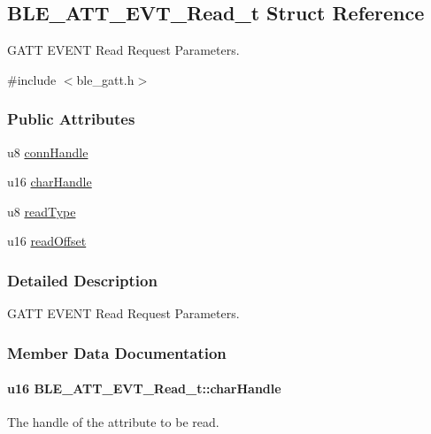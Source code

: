 \hypertarget{struct_b_l_e___a_t_t___e_v_t___read__t}{}\subsection{B\+L\+E\+\_\+\+A\+T\+T\+\_\+\+E\+V\+T\+\_\+\+Read\+\_\+t Struct Reference}
\label{struct_b_l_e___a_t_t___e_v_t___read__t}


G\+A\+TT E\+V\+E\+NT Read Request Parameters.  




{\ttfamily \#include $<$ble\+\_\+gatt.\+h$>$}

\subsubsection*{Public Attributes}
\begin{DoxyCompactItemize}
\item 
u8 \hyperlink{struct_b_l_e___a_t_t___e_v_t___read__t_a2a218e82f1e992578b24197543bb06f5}{conn\+Handle}
\item 
u16 \hyperlink{struct_b_l_e___a_t_t___e_v_t___read__t_af985d4621a69dc2b6b9fe07c2b975d86}{char\+Handle}
\item 
u8 \hyperlink{struct_b_l_e___a_t_t___e_v_t___read__t_ab618c0035772a3aa76192f9a76690cbc}{read\+Type}
\item 
u16 \hyperlink{struct_b_l_e___a_t_t___e_v_t___read__t_a59fd444a9c256ed3f3eead9a5222c60a}{read\+Offset}
\end{DoxyCompactItemize}


\subsubsection{Detailed Description}
G\+A\+TT E\+V\+E\+NT Read Request Parameters. 

\subsubsection{Member Data Documentation}
\paragraph[{\texorpdfstring{char\+Handle}{charHandle}}]{\setlength{\rightskip}{0pt plus 5cm}u16 B\+L\+E\+\_\+\+A\+T\+T\+\_\+\+E\+V\+T\+\_\+\+Read\+\_\+t\+::char\+Handle}\hypertarget{struct_b_l_e___a_t_t___e_v_t___read__t_af985d4621a69dc2b6b9fe07c2b975d86}{}\label{struct_b_l_e___a_t_t___e_v_t___read__t_af985d4621a69dc2b6b9fe07c2b975d86}
The handle of the attribute to be read. 
